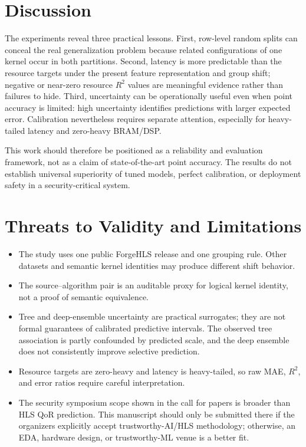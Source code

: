 \documentclass[conference]{IEEEtran}
\begin{document}
\section{Discussion}
The experiments reveal three practical lessons. First, row-level random splits can conceal the real generalization problem because related configurations of one kernel occur in both partitions. Second, latency is more predictable than the resource targets under the present feature representation and group shift; negative or near-zero resource $R^2$ values are meaningful evidence rather than failures to hide. Third, uncertainty can be operationally useful even when point accuracy is limited: high uncertainty identifies predictions with larger expected error. Calibration nevertheless requires separate attention, especially for heavy-tailed latency and zero-heavy BRAM/DSP.

This work should therefore be positioned as a reliability and evaluation framework, not as a claim of state-of-the-art point accuracy. The results do not establish universal superiority of tuned models, perfect calibration, or deployment safety in a security-critical system.

\section{Threats to Validity and Limitations}
\begin{itemize}
    \item The study uses one public ForgeHLS release and one grouping rule. Other datasets and semantic kernel identities may produce different shift behavior.
    \item The source--algorithm pair is an auditable proxy for logical kernel identity, not a proof of semantic equivalence.
    \item Tree and deep-ensemble uncertainty are practical surrogates; they are not formal guarantees of calibrated predictive intervals. The observed tree association is partly confounded by predicted scale, and the deep ensemble does not consistently improve selective prediction.
    \item Resource targets are zero-heavy and latency is heavy-tailed, so raw MAE, $R^2$, and error ratios require careful interpretation.
    \item The security symposium scope shown in the call for papers is broader than HLS QoR prediction. This manuscript should only be submitted there if the organizers explicitly accept trustworthy-AI/HLS methodology; otherwise, an EDA, hardware design, or trustworthy-ML venue is a better fit.
\end{itemize}
\end{document}
